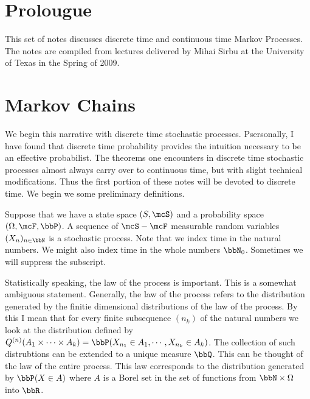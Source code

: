 \documentclass{report}
\begin{document}
\large %
\linespread{1.1} %

\setcounter{section}{0}

\tableofcontents

\chapter{Prolougue}

This set of notes discusses discrete time and continuous time Markov Processes.  The notes are compiled from lectures delivered by Mihai Sirbu at the University of Texas in the Spring of 2009.

\chapter{Markov Chains}

We begin this narrative with discrete time stochastic processes.  Psersonally, I have found that discrete time probability provides the intuition necessary to be an effective probabilist.  The theorems one encounters in discrete time stochastic processes almost always carry over to continuous time, but with slight technical modifications.  Thus the first portion of these notes will be devoted to discrete time.  We begin we some preliminary definitions.

Suppose that we have a state space $(S,\mcS)$ and a probability space $(\Omega, \mcF, \bbP)$.  A sequence of $\mcS-\mcF$ measurable random variables $(X_n)_{n \in \bbN}$ is a stochastic process.  Note that we index time in the natural numbers.  We might also index time in the whole numbers $\bbN_0$.  Sometimes we will suppress the subscript.

Statistically speaking, the law of the process is important.  This is a somewhat ambiguous statement.  Generally, the law of the process refers to the distribution generated by the finitie dimensional distributions of the law of the process.  By this I mean that for every finite subsequence $(n_k)$ of the natural numbers we look at the distribution defined by $Q^{(n)}(A_1 \times \cdots \times A_k) = \bbP(X_{n_1} \in A_1, \cdots, X_{n_k} \in A_k)$.  The collection of such distrubtions can be extended to a unique measure $\bbQ$.  This can be thought of the law of the entire process.  This law corresponds to the distribution generated by $\bbP(X \in A)$ where $A$ is a Borel set in the set of functions from $\bbN \times \Omega$ into $\bbR$.
\end{document}
